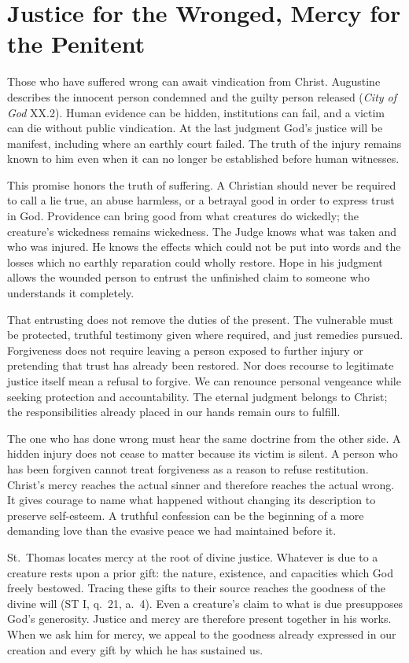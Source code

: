 \section{Justice for the Wronged, Mercy for the Penitent}

Those who have suffered wrong can await vindication from Christ. Augustine describes the innocent person condemned and the guilty person released (\emph{City of God} XX.2). Human evidence can be hidden, institutions can fail, and a victim can die without public vindication. At the last judgment God's justice will be manifest, including where an earthly court failed. The truth of the injury remains known to him even when it can no longer be established before human witnesses.

This promise honors the truth of suffering. A Christian should never be required to call a lie true, an abuse harmless, or a betrayal good in order to express trust in God. Providence can bring good from what creatures do wickedly; the creature's wickedness remains wickedness. The Judge knows what was taken and who was injured. He knows the effects which could not be put into words and the losses which no earthly reparation could wholly restore. Hope in his judgment allows the wounded person to entrust the unfinished claim to someone who understands it completely.

That entrusting does not remove the duties of the present. The vulnerable must be protected, truthful testimony given where required, and just remedies pursued. Forgiveness does not require leaving a person exposed to further injury or pretending that trust has already been restored. Nor does recourse to legitimate justice itself mean a refusal to forgive. We can renounce personal vengeance while seeking protection and accountability. The eternal judgment belongs to Christ; the responsibilities already placed in our hands remain ours to fulfill.

The one who has done wrong must hear the same doctrine from the other side. A hidden injury does not cease to matter because its victim is silent. A person who has been forgiven cannot treat forgiveness as a reason to refuse restitution. Christ's mercy reaches the actual sinner and therefore reaches the actual wrong. It gives courage to name what happened without changing its description to preserve self-esteem. A truthful confession can be the beginning of a more demanding love than the evasive peace we had maintained before it.

St.~Thomas locates mercy at the root of divine justice. Whatever is due to a creature rests upon a prior gift: the nature, existence, and capacities which God freely bestowed. Tracing these gifts to their source reaches the goodness of the divine will (ST I, q.~21, a.~4). Even a creature's claim to what is due presupposes God's generosity. Justice and mercy are therefore present together in his works. When we ask him for mercy, we appeal to the goodness already expressed in our creation and every gift by which he has sustained us.

